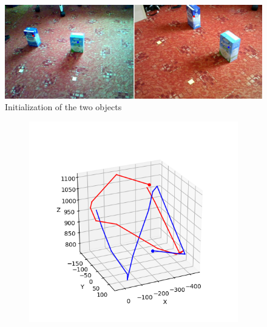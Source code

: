 \begin{figure}[p]
\includegraphics[width=\linewidth]{img/experiments/two-objects.png}
\caption{Initialization of the two objects}
\label{fig:two-init}
\end{figure}

\begin{figure}
\centering
\begin{subfigure}{0.48\linewidth}
	\includegraphics[width=\linewidth]{img/experiments/trajectories1.png}
\end{subfigure}
\begin{subfigure}{0.48\linewidth}

\end{subfigure}
\end{figure}
